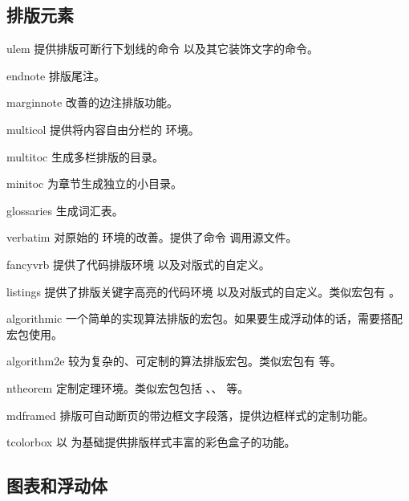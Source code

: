 \subsection{排版元素}\label{subsec:pkg-elements}

\begin{pkglist}
  \item[ulem]     提供排版可断行下划线的命令  以及其它装饰文字的命令。
  \item[endnote]  排版尾注。
  \item[marginnote] 改善的边注排版功能。
  \item[multicol] 提供将内容自由分栏的  环境。
  \item[multitoc] 生成多栏排版的目录。
  \item[minitoc]  为章节生成独立的小目录。
  \item[glossaries] 生成词汇表。
  \item[verbatim] 对原始的  环境的改善。提供了命令  调用源文件。
  \item[fancyvrb] 提供了代码排版环境  以及对版式的自定义。
  \item[listings] 提供了排版关键字高亮的代码环境  以及对版式的自定义。类似宏包有 。
  \item[algorithmic] 一个简单的实现算法排版的宏包。如果要生成浮动体的话，需要搭配  宏包使用。
  \item[algorithm2e] 较为复杂的、可定制的算法排版宏包。类似宏包有  等。
  \item[ntheorem] 定制定理环境。类似宏包包括 、、 等。
  \item[mdframed] 排版可自动断页的带边框文字段落，提供边框样式的定制功能。
  \item[tcolorbox] 以 \TikZ{} 为基础提供排版样式丰富的彩色盒子的功能。
\end{pkglist}

\subsection{图表和浮动体}\label{subsec:pkg-tab-fig}

